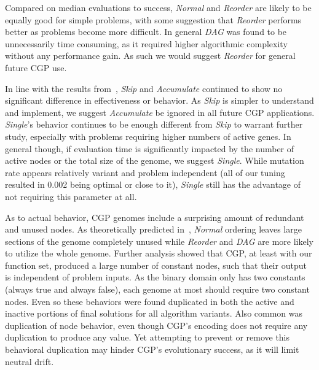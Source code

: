 \documentclass[journal]{IEEEtran}
\begin{document}
Compared on median evaluations to success, \emph{Normal} and \emph{Reorder} are
likely to be equally good for simple problems, with some suggestion that \emph{Reorder}
performs better as problems become more difficult.  In general \emph{DAG} was found
to be unnecessarily time consuming, as it required higher algorithmic complexity
without any performance gain.  As such we would suggest \emph{Reorder} for general
future CGP use.

In line with the results from~\cite{goldman:2013:cgpwaste}, \emph{Skip} and
\emph{Accumulate} continued to show no significant difference in effectiveness
or behavior.  As \emph{Skip} is simpler to understand and implement, we suggest
\emph{Accumulate} be ignored in all future CGP applications.  \emph{Single}'s
behavior continues to be enough different from \emph{Skip} to warrant further
study, especially with problems requiring higher numbers of active genes.  In
general though, if evaluation time is significantly impacted by the number of
active nodes or the total size of the genome, we suggest \emph{Single}.  While
mutation rate appears relatively variant and problem independent (all of our tuning
resulted in 0.002 being optimal or close to it), \emph{Single} still has the
advantage of not requiring this parameter at all.

As to actual behavior, CGP genomes include a surprising amount of redundant and
unused nodes.  As theoretically predicted in~\cite{goldman:2013:ordering},
\emph{Normal} ordering leaves large sections of the genome completely unused
while \emph{Reorder} and \emph{DAG} are more likely to utilize the whole genome.
Further analysis showed that CGP, at least with our function set, produced a large
number of constant nodes, such that their output is independent of problem
inputs.  As the binary domain only has two constants (always true and always false),
each genome at most should require two constant nodes.  Even so these behaviors
were found duplicated in both the active and inactive portions of final solutions
for all algorithm variants.  Also common was duplication of node behavior, even
though CGP's encoding does not require any duplication to produce any value.  Yet
attempting to prevent or remove this behavioral duplication may hinder CGP's evolutionary
success, as it will limit neutral drift.
\end{document}
